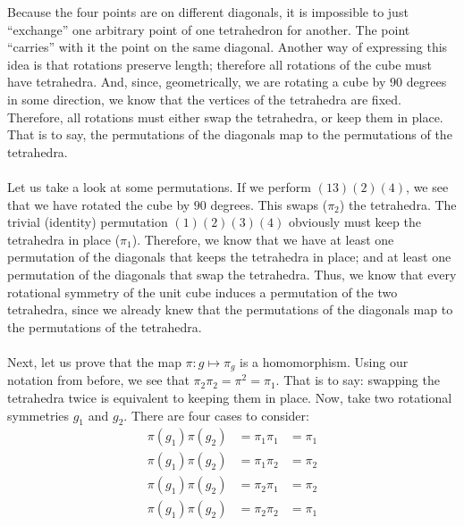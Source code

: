\documentclass[letterpaper]{article}
\begin{document}
Because the four points are on different diagonals, it is impossible to just ``exchange'' one arbitrary point of one tetrahedron for another.
The point ``carries'' with it the point on the same diagonal.
Another way of expressing this idea is that rotations preserve length; therefore all rotations of the cube must have tetrahedra.
And, since, geometrically, we are rotating a cube by $ 90 $ degrees in some direction, we know that the vertices of the tetrahedra are fixed.
Therefore, all rotations must either swap the tetrahedra, or keep them in place.
That is to say, the permutations of the diagonals map to the permutations of the tetrahedra.
\\ \\
Let us take a look at some permutations.
If we perform $ (13)(2)(4) $, we see that we have rotated the cube by $ 90 $ degrees.
This swaps ($ \pi_2 $) the tetrahedra.
The trivial (identity) permutation $ (1)(2)(3)(4) $ obviously must keep the tetrahedra in place ($ \pi_1 $).
Therefore, we know that we have at least one permutation of the diagonals that keeps the tetrahedra in place; and at least one permutation of the diagonals that swap the tetrahedra.
Thus, we know that every rotational symmetry of the unit cube induces a permutation of the two tetrahedra, since we already knew that the permutations of the diagonals map to the permutations of the tetrahedra.
\\ \\
Next, let us prove that the map $ \pi : g \mapsto \pi_g $ is a homomorphism.
Using our notation from before, we see that $ \pi_2 \pi_2 = \pi^2 = \pi_1 $.
That is to say: swapping the tetrahedra twice is equivalent to keeping them in place.
Now, take two rotational symmetries $ g_1 $ and $ g_2 $.
There are four cases to consider:
\begin{align}
    \pi(g_1) \pi(g_2) &= \pi_1 \pi_1 &= \pi_1 \\
    \pi(g_1) \pi(g_2) &= \pi_1 \pi_2 &= \pi_2 \\
    \pi(g_1) \pi(g_2) &= \pi_2 \pi_1 &= \pi_2 \\
    \pi(g_1) \pi(g_2) &= \pi_2 \pi_2 &= \pi_1
\end{align}
\end{document}
